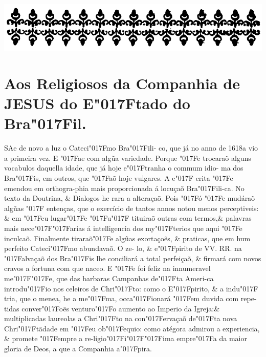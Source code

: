 \documentclass[openany,titlepage,12pt]{book}
\renewcommand{\chaptermark}[1]{\markboth{#1}{}}
\renewcommand{\sectionmark}[1]{\gdef\rightmark{#1}}
\newcommand{\lgS}{\char"017F}
\newcommand{\lgSS}{\char"017F\char"017F}
\begin{document}
\begin{center}
    \includegraphics[scale=0.20]{02-aos_religiosos.png}
\end{center}
\section{Aos Religiosos da Companhia de 
JESUS do E\lgS tado do Bra\lgS il.}
\chaptermark{}
\sectionmark{}
\vspace*{14pt}

\lettrine[findent=2pt, nindent=0pt, lines=2]
{S}{A}e de novo a luz o Cateci\lgS mo Bra\lgS ili-\linebreak
co, que já no anno de 1618a vio a primeira vez. E \lgS ae
com algũa variedade. Porque \lgS e trocaraõ alguns vocabulos 
daquella idade, que já hoje e\lgS tranha o commum idio-
ma dos Bra\lgS is, em outros, que \lgS aõ hoje vulgares. A e\lgS 
crita \lgS e emendou em orthogra-phia mais proporcionada á 
locuçaõ Bra\lgS ili-ca. No texto da Doutrina, \& Dialogos he
rara a alteraçaõ. Pois \lgS ó \lgS e mudáraõ algũas \lgS 
entenças, que o exercício de tantos annos notou menos 
perceptiveis: \& em \lgS eu lugar\linebreak \lgS e \lgS u\lgS  
tituiraõ outras com termos,\& palavras mais nece\lgSS arias 
á intelligencia dos my\lgS terios que aqui \lgS e inculcaõ. 
Finalmente tiraraõ\lgS e  algũas exortaçoẽs, \& praticas, que em
hum perfeito Cateci\lgS mo abundavaõ. O ze-\linebreak
lo, \& e\lgS pirito
de VV. RR. na \lgS alvaçaõ dos Bra\lgS is lhe conciliará a 
total perfeiçaõ, \& firmará com novos cravos a fortuna com 
que naceo. E \lgS e foi feliz na innumeravel me\lgSS e, que 
das barbaras Campanhas de\lgS ta Ameri-ca introdu\lgS io nos
celeiros de Chri\lgS to: como o E\lgS pirito, \& a indu\lgS
tria, que o menea, he a me\lgS ma, occa\lgS ionará \lgS em 
duvida com repe-tidas conver\lgS oẽs venturo\lgS o aumento ao
Imperio da Igreja:\& multiplicadas laureolas a Chri\lgS to
na con\lgS ervaçaõ de\lgS ta nova Chri\lgS tãdade em \lgS eu
ob\lgS equio: como atégora admirou a experiencia, \& promete
\lgS empre a re-\linebreak ligio\lgS i\lgSS ima empre\lgS a da maior 
gloria de\linebreak
Deos, a que a Companhia a\lgS pira.
\newpage
\end{document}
